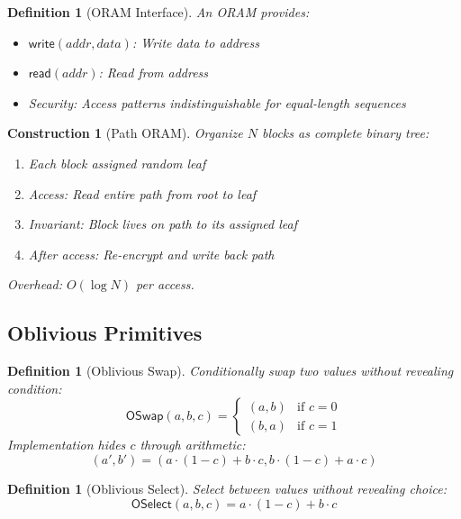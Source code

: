 \documentclass[11pt,final,hidelinks]{article}
\newcommand{\Read}{\mathsf{read}}
\newcommand{\Write}{\mathsf{write}}
\newtheorem{definition}[theorem]{Definition}
\newtheorem{construction}[theorem]{Construction}
\begin{document}
\begin{definition}[ORAM Interface]
An ORAM provides:
\begin{itemize}
    \item $\Write(addr, data)$: Write data to address
    \item $\Read(addr)$: Read from address
    \item Security: Access patterns indistinguishable for equal-length sequences
\end{itemize}
\end{definition}

\begin{construction}[Path ORAM]
Organize $N$ blocks as complete binary tree:
\begin{enumerate}
    \item Each block assigned random leaf
    \item Access: Read entire path from root to leaf
    \item Invariant: Block lives on path to its assigned leaf
    \item After access: Re-encrypt and write back path
\end{enumerate}
Overhead: $O(\log N)$ per access.
\end{construction}

\subsection{Oblivious Primitives}

\begin{definition}[Oblivious Swap]
Conditionally swap two values without revealing condition:
\begin{equation}
\mathsf{OSwap}(a, b, c) = \begin{cases}
(a, b) & \text{if } c = 0\\
(b, a) & \text{if } c = 1
\end{cases}
\end{equation}
Implementation hides $c$ through arithmetic:
\begin{equation}
(a', b') = (a \cdot (1-c) + b \cdot c, b \cdot (1-c) + a \cdot c)
\end{equation}
\end{definition}

\begin{definition}[Oblivious Select]
Select between values without revealing choice:
\begin{equation}
\mathsf{OSelect}(a, b, c) = a \cdot (1-c) + b \cdot c
\end{equation}
\end{definition}
\end{document}
